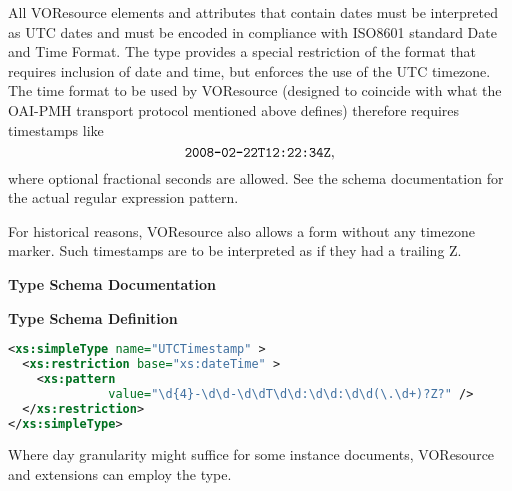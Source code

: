 \documentclass[11pt,a4paper]{ivoa}
\begin{document}
All VOResource elements and attributes that contain dates must be
interpreted as UTC dates and must be encoded in compliance with ISO8601
\citep{std:iso8601}
standard Date and Time Format.  The  type
provides a special restriction of the format that requires inclusion of
date and time, but enforces the use of the UTC timezone.  The time
format to be used by VOResource (designed to coincide with
what the OAI-PMH transport protocol mentioned above defines)
therefore requires timestamps like
$$\hbox{\texttt{2008-02-22T12:22:34Z}},$$
where optional fractional seconds are allowed.  See the schema
documentation for the actual regular expression pattern.

For historical reasons, VOResource also allows a form without any
timezone marker.  Such timestamps are to be interpreted as  if they had
a trailing Z.

\begin{generated}
\begingroup
        \renewcommand*\descriptionlabel[1]{%
        \hbox to 5.5em{\emph{#1}\hfil}}\vspace{2ex}\noindent\textbf{ Type Schema Documentation}


\vspace{1ex}\noindent\textbf{ Type Schema Definition}

\begin{lstlisting}[language=XML,basicstyle=\footnotesize]
<xs:simpleType name="UTCTimestamp" >
  <xs:restriction base="xs:dateTime" >
    <xs:pattern
              value="\d{4}-\d\d-\d\dT\d\d:\d\d:\d\d(\.\d+)?Z?" />
  </xs:restriction>
</xs:simpleType>
\end{lstlisting}\endgroup
\end{generated}



Where day granularity might suffice for some instance documents,
VOResource and extensions can
employ the  type.
\end{document}
